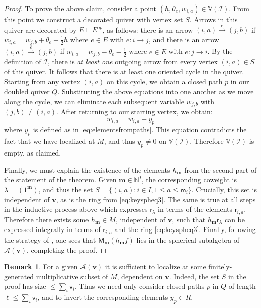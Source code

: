 \documentclass[11pt,reqno]{amsart}
\renewcommand{\mathbf}{\mathbold}
\numberwithin{equation}{section}
\theoremstyle{definition}
\newtheorem{Remark}[equation]{Remark}
\newcommand{\cA}{\mathcal{A}}
\newcommand{\bm}{\mathbf{m}}
\newcommand{\bv}{\mathbf{v}}
\newcommand{\NN}{\mathbb{N}}
\renewcommand{\bv}{\mathbf{v}} %
\newcommand{\sv}{\mathsf{v}}
\newcommand{\sm}{\mathsf{m}}
\newcommand{\M}{\mathsf{M}}
\newcommand{\sfr}{{\mathsf{r}}}
\newcommand{\quiver}{Q}
\newcommand{\vertexset}{I}
\newcommand{\arrowset}{E}
\newcommand{\base}{R}
\newcommand{\la}{\lambda}
\newcommand{\qzast}{\cA}
\begin{document}
\begin{proof}
    To prove the above claim, consider a point $(\hbar, \theta_e, w_{i,a}) \in \mathbb{V}(\mathcal{I})$. From this point we construct a decorated quiver with vertex set $S$.   Arrows in this quiver are decorated by $\arrowset\sqcup \arrowset^{op}$, as follows: there is an arrow $(i,a) \xrightarrow{e} (j,b)$ if  $w_{i,a} = w_{j,b} + \theta_e -\tfrac{1}{2}\hbar $ where $e \in \arrowset$ with $e: i\rightarrow j$, and there is an arrow $(i,a) \xrightarrow{\overline{e}} (j,b)$ if $w_{i,a} = w_{j,b} -\theta_e - \tfrac{1}{2}$ where $e\in \arrowset$ with $e:j\rightarrow i$. By the definition of $\mathcal{I}$, there is \emph{at least one}  outgoing arrow from every vertex $(i,a) \in S$ of this quiver. It follows that there is at least one oriented cycle in the quiver. Starting from any vertex $(i,a)$ on this cycle, we obtain a closed path $p$ in our doubled quiver $\overline{\quiver}$.  Substituting the above equations into one another as we move along the cycle, we can eliminate each subsequent variable $w_{j,b}$ with $(j,b) \neq (i,a)$. After returning to our starting vertex, we obtain:
    $$
        w_{i,a} = w_{i,a} + y_p
    $$
    where $y_p$ is defined as in \eqref{eq:elementsfrompaths}. This equation contradicts the fact that we have localized at $M$, and thus $y_p \neq 0$ on $\mathbb{V}(\mathcal I)$. Therefore $\mathbb{V}(\mathcal I)$ is empty, as claimed.

    Finally, we must explain the existence of the elements $h_\bm$ from the second part of the statement of the theorem.  Given $\bm \in \NN^\vertexset$, the corresponding coweight is $\la = (1^\bm)$, and thus the set ${S = \{(i,a) : i \in \vertexset, 1 \leq a \leq \sm_i\}}$.  Crucially, this set is independent of $\bv$, as is the ring from \eqref{eq:keyspheq3}.  The same is true at all steps in the inductive process above which expresses $\sfr_\lambda$ in terms of the elements $\sfr_{i,a}$. Therefore there exists some $h_\bm \in M$, independent of $\bv$, such that $h_\bm \sfr_\lambda$ can be expressed integrally in terms of $\sfr_{i,a}$ and the ring \eqref{eq:keyspheq3}. Finally, following the strategy of \cite[Theorem 3.7]{Weekes}, one sees that $\M_\bm(h_\bm f)$ lies in the spherical subalgebra of $\qzast(\bv)$, completing the proof.
\end{proof}

\begin{Remark}
    For a given $\qzast(\bv)$ it is sufficient to localize at some finitely-generated multiplicative subset of $M$, dependent on $\bv$. Indeed, the set $S$ in the proof has size $\leq\sum_i \sv_i$. Thus we need only consider closed paths $p$ in $\overline{Q}$ of length $\ell \leq \sum_i \sv_i$, and to invert the corresponding elements $y_p \in \base$.
    
\end{Remark}
\end{document}
